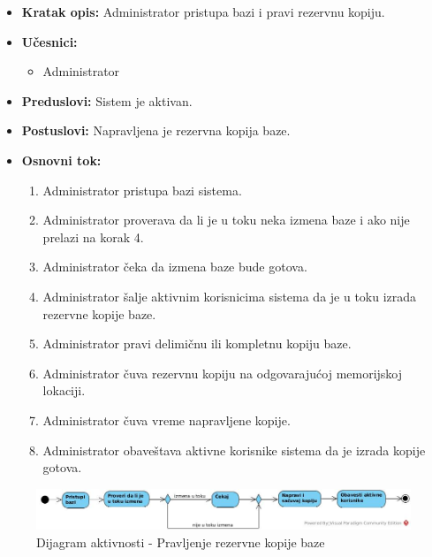 \documentclass[titlepage]{article}
\begin{document}
\begin{itemize}
    \item \textbf{Kratak opis:} Administrator pristupa bazi i pravi rezervnu kopiju.
    \item \textbf{Učesnici:}
        \begin{itemize}
            \item Administrator
        \end{itemize}
    \item \textbf{Preduslovi:} Sistem je aktivan.
    \item \textbf{Postuslovi:} Napravljena je rezervna kopija baze.
    \item \textbf{Osnovni tok:}
        \begin{enumerate}
            \item Administrator pristupa bazi sistema.
            \item Administrator proverava da li je u toku neka izmena baze i ako nije prelazi na korak 4.
            \item Administrator čeka da izmena baze bude gotova.
            \item Administrator šalje aktivnim korisnicima sistema da je u toku izrada rezervne kopije baze.
            \item Administrator pravi delimičnu ili kompletnu kopiju baze.
            \item Administrator čuva rezervnu kopiju na odgovarajućoj memorijskoj lokaciji.
            \item Administrator čuva vreme napravljene kopije.
            \item Administrator obaveštava aktivne korisnike sistema da je izrada kopije gotova.
        \end{enumerate}
\end{itemize}

\begin{figure}[H]
\centering
\includegraphics[scale=0.45]{Kopija}
\caption{Dijagram aktivnosti - Pravljenje rezervne kopije baze}
\label{slk:dodavanje}
\end{figure}
\end{document}

